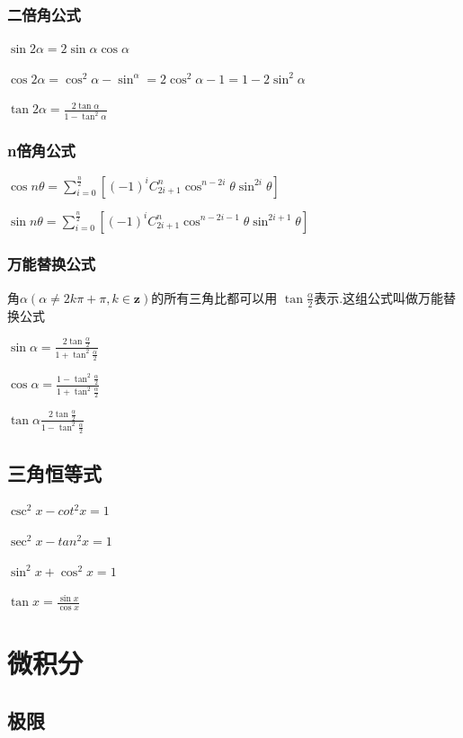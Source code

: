 \documentclass[UTF8]{ctexbook}
\newcommand{\mathCombination}[2]{C_{#1}^{#2}}
\begin{document}
{{{\subsubsection{二倍角公式}{
  $\sin2\alpha = 2\sin\alpha\cos\alpha$

  $\cos2\alpha = \cos^2\alpha - \sin^\alpha = 2\cos^2\alpha - 1 = 1 - 2\sin^2\alpha$

  $\tan2\alpha = \frac{2\tan\alpha}{1 - \tan^2\alpha}$
}

\subsubsection{n倍角公式}{
$\cos{n\theta} = \sum_{i = 0}^{\frac{n}{2}}[(-1)^i\mathCombination{2i + 1}{n}\cos^{n - 2i}\theta\sin^{2i}\theta]$

$\sin{n\theta} = \sum_{i = 0}^{\frac{n}{2}}[(-1)^i\mathCombination{2i + 1}{n}\cos^{n - 2i - 1}\theta\sin^{2i+1}\theta]$
}

\subsubsection{万能替换公式}{
  角$\alpha(\alpha \neq 2k\pi + \pi ,k \in \mathbf{z})$的所有三角比都可以用 $\tan\frac{\alpha}{2}$表示.这组公式叫做万能替换公式

  $\sin\alpha = \frac{2\tan\frac{\alpha}{2}}{1+\tan^2\frac{\alpha}{2}}$

  $\cos\alpha = \frac{1 - \tan^2\frac{\alpha}{2}}{1 + \tan^2\frac{\alpha}{2}}$

  $\tan\alpha \frac{2\tan\frac{\alpha}{2}}{1 - \tan^2\frac{\alpha}{2}}$
}

\subsection{三角恒等式}{
$\csc^2{x} - cot^2{x} = 1$

$\sec^2x - tan^2x = 1$ %

$\sin^2x + \cos^2x = 1$

$\tan{x} = \frac{\sin{x}}{\cos{x}}$
}

}

\section{微积分}{

  \subsection{极限}{

}}}}
\end{document}
